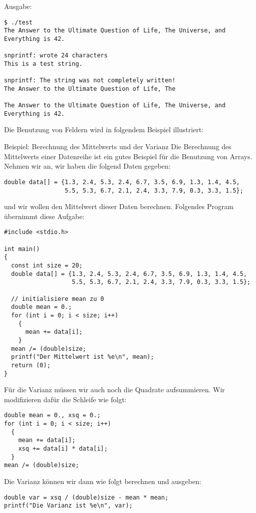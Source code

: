\noindent Ausgabe:
\begin{verbatim}
$ ./test
The Answer to the Ultimate Question of Life, The Universe, and Everything is 42.

snprintf: wrote 24 characters
This is a test string.

snprintf: The string was not completely written!
The Answer to the Ultimate Question of Life, The

The Answer to the Ultimate Question of Life, The Universe, and Everything is 42.
\end{verbatim}

Die Benutzung von Feldern wird in folgendem Beispiel illustriert:
\begin{myexampleprogram}{Beispiel: Berechnung des Mittelwerts und der Varianz}
  Die Berechnung des Mittelwerts einer Datenreihe ist ein gutes Beispiel für die Benutzung von Arrays.
  Nehmen wir an, wir haben die folgend Daten gegeben:
\begin{lstlisting}
double data[] = {1.3, 2.4, 5.3, 2.4, 6.7, 3.5, 6.9, 1.3, 1.4, 4.5,
                 5.5, 5.3, 6.7, 2.1, 2.4, 3.3, 7.9, 0.3, 3.3, 1.5};
\end{lstlisting}
  und wir wollen den Mittelwert dieser Daten berechnen.
  Folgendes Program übernimmt diese Aufgabe:
\begin{lstlisting}
#include <stdio.h>

int main()
{
  const int size = 20;
  double data[] = {1.3, 2.4, 5.3, 2.4, 6.7, 3.5, 6.9, 1.3, 1.4, 4.5,
                   5.5, 5.3, 6.7, 2.1, 2.4, 3.3, 7.9, 0.3, 3.3, 1.5};

  // initialisiere mean zu 0
  double mean = 0.;
  for (int i = 0; i < size; i++)
    {
      mean += data[i];
    }
  mean /= (double)size;
  printf("Der Mittelwert ist %e\n", mean);
  return (0);
}
\end{lstlisting}
  Für die Varianz müssen wir auch noch die Quadrate aufsummieren.
  Wir modifizieren dafür die Schleife wie folgt:
\begin{lstlisting}
double mean = 0., xsq = 0.;
for (int i = 0; i < size; i++)
  {
    mean += data[i];
    xsq += data[i] * data[i];
  }
mean /= (double)size;
\end{lstlisting}
  Die Varianz können wir dann wie folgt berechnen und ausgeben:
\begin{lstlisting}
double var = xsq / (double)size - mean * mean;
printf("Die Varianz ist %e\n", var);
\end{lstlisting}
\end{myexampleprogram}


\endinput
